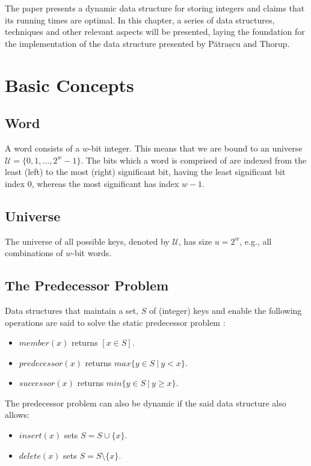 The \cite{patrascu2014dynamic} paper presents a dynamic data structure for storing integers and claims that its running times are optimal.
In this chapter, a series of data structures, techniques and other relevant aspects will be presented, laying the foundation for the implementation of the data structure presented by Pătrașcu and Thorup.

\section{Basic Concepts}

\subsection{Word}
A word consists of a $w$-bit integer. This means that we are bound to an universe $\mathcal U = \{0, 1, ..., 2^{w}-1\}$. The bits which a word is comprised of are indexed from the least (left) to the most (right) significant bit, having the least significant bit index $0$, whereas the most significant has index $w-1$.

\subsection{Universe}
The universe of all possible keys, denoted by $\mathcal U$, has size $u = 2^{w}$, e.g., all combinations of $w$-bit words.

\subsection{The Predecessor Problem}\label{sec:predecessorProblem}
Data structures that maintain a set, $S$ of (integer) keys and enable the following operations are said to solve the static predecessor problem \cite{beame1999optimal}:
\begin{itemize}
    \item
    $member(x)$ returns $[x \in S]$.
    \item
    $predecessor(x)$ returns $max\{y\in S\ |\ y < x\}$.
    \item
    $successor(x)$ returns $min\{y\in S\ |\ y \geq x\}$.
\end{itemize}

The predecessor problem can also be dynamic \cite{beame1999optimal} if the said data structure also allows:
\begin{itemize}
    \item
    $insert(x)$ sets $S=S \cup \{x\}$.
    \item
    $delete(x)$ sets $S=S \setminus \{x\}$.
\end{itemize}

